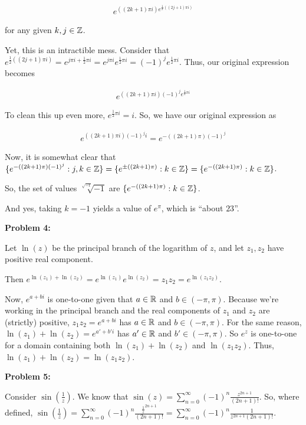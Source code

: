 \documentclass[a4paper,12pt]{article}
\begin{document}
\begin{align*}
e^{((2k+1)\pi i)e^{\frac{1}{2}((2j+1)\pi i)}} 
\end{align*} %

for any given $k, j \in \mathbb{Z}$.

Yet, this is an intractible mess. Consider that $e^{\frac{1}{2}((2j+1)\pi i)} = e^{j \pi i + \frac{1}{2} \pi i} = e^{j\pi i} e^{\frac{1}{2} \pi i} = (-1)^j e^{\frac{1}{2} \pi i}$. Thus, our original expression becomes

\begin{align*}
e^{((2k+1)\pi i)(-1)^j e^{\frac{1}{2} \pi i}} 
\end{align*}

To clean this up even more, $e^{\frac{1}{2} \pi i}=i$. So, we have our original expression as 

\begin{align*}
e^{((2k+1)\pi i)(-1)^j i}  = e^{-((2k+1)\pi)(-1)^j}
\end{align*}

Now, it is somewhat clear that $\{e^{-((2k+1)\pi)(-1)^j}: j, k \in \mathbb{Z} \} = \{ e^{ \pm ((2k+1)\pi)}: k \in \mathbb{Z} \} = \{e^{-((2k+1)\pi)}: k \in \mathbb{Z} \}$.

So, the set of values $\sqrt[\sqrt{-1}]{-1}$ are $\{e^{-((2k+1)\pi)}: k \in \mathbb{Z} \}$. 

And yes, taking $k=-1$ yields a value of $e^\pi$, which is ``about $23$''.

\shunt

{\bf Problem 4:}

Let $\ln(z)$ be the principal branch of the logarithm of $z$, and let $z_1, z_2$ have positive real component.

Then $e^{\ln(z_1)+\ln(z_2)} = e^{\ln(z_1)}e^{\ln(z_2)} = z_1z_2 = e^{\ln(z_1z_2)}$.

Now, $e^{a+bi}$ is one-to-one given that $a \in \mathbb{R}$ and $b \in (-\pi,\pi)$. Because we're working in the principal branch and the real components of $z_1$ and $z_2$ are (strictly) positive, $z_1z_2 = e^{a+bi}$ has $a \in \mathbb{R}$ and $b \in (-\pi,\pi)$. For the same reason, $\ln(z_1)+\ln(z_2) = e^{a'+b'i}$ has $a' \in \mathbb{R}$ and $b' \in (-\pi, \pi)$. So $e^{z}$ is one-to-one for a domain containing both $\ln(z_1)+\ln(z_2)$ and $\ln(z_1z_2)$. Thus, $\ln(z_1)+\ln(z_2) = \ln(z_1z_2)$.

\shunt

{\bf Problem 5:}

Consider $\sin(\frac{1}{z})$. We know that $\sin(z) = \sum\limits_{n=0}^\infty (-1)^n \frac{z^{2n+1}}{(2n+1)!}$. So, where defined, $\sin(\frac{1}{z}) = \sum\limits_{n=0}^\infty (-1)^n \frac{\frac{1}{z}^{2n+1}}{(2n+1)!} = \sum\limits_{n=0}^\infty (-1)^n \frac{1}{z^{2n+1}(2n+1)!}$.
\end{document}

